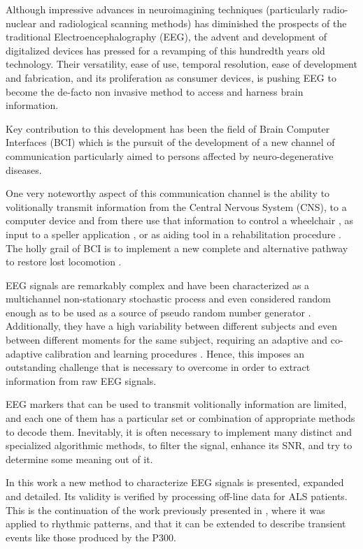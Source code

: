 \documentclass[entropy,article,submit,moreauthors,pdftex,10pt,a4paper]{mdpi}
\begin{document}
Although impressive advances in neuroimagining techniques (particularly radio-nuclear and radiological scanning methods) \citep{Schomer2010} has diminished the prospects of the traditional Electroencephalography (EEG), the advent and development of digitalized devices has pressed for a revamping of this hundredth years old technology.  Their versatility, ease of use, temporal resolution, ease of development and fabrication, and its proliferation as consumer devices, is pushing EEG to become the de-facto non invasive method to access and harness brain information.

Key contribution to this development has been the field of Brain Computer Interfaces (BCI) \citep{WolpawJonathanR2012} which is the pursuit of the development of a new channel of communication particularly aimed to persons affected by neuro-degenerative diseases.

One very noteworthy aspect of this communication channel is the ability to volitionally transmit information from the Central Nervous System (CNS), to a computer device and from there use that information to control a wheelchair \citep{Carlson2013}, as input to a speller application \citep{Guger2009a}, or as aiding tool in a rehabilitation procedure \citep{Jure2016}.  The holly grail of BCI is to implement a new complete and alternative pathway to restore lost locomotion \citep{WolpawJonathanR2012}.

EEG signals are remarkably complex and have been characterized as a multichannel non-stationary stochastic process and even considered random enough as to be used as a source of pseudo random number generator \citep{Chen2014}. Additionally, they have a high variability between different subjects and even between different moments for the same subject, requiring an adaptive and co-adaptive calibration and learning procedures \citep{Clerc}.  Hence, this imposes an outstanding challenge that is necessary to overcome in order to extract information from raw EEG signals.

EEG markers \citep{Clerc} that can be used to transmit volitionally information are limited, and each one of them has a particular set or combination of appropriate methods to decode them. Inevitably, it is often necessary to implement many distinct and specialized algorithmic methods, to filter the signal, enhance its SNR, and try to determine some meaning out of it.  

In this work a new method to characterize EEG signals is presented, expanded and detailed.  Its validity is verified by processing off-line data for ALS patients.  This is the continuation of the work previously presented in \citep{Ramele2016}, where it was applied to rhythmic patterns, and that it can be extended to describe transient events like those produced by the P300\citep{Knuth2006}.
\end{document}
